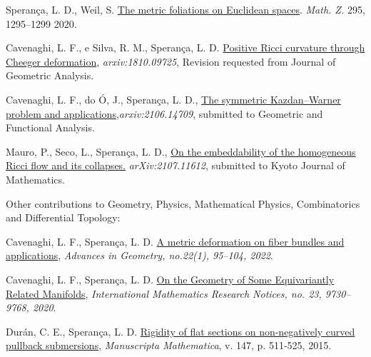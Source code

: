 \documentclass[10pt]{article}
\newenvironment{innerlist}[1][\enskip\textbullet]%
{\begin{compactitem}[#1]}{\end{compactitem}}
\begin{document}
\begin{enumerate}
\begin{innerlist}[-]
		
		\item Sperança, L. D., Weil, S.  \href{https://link.springer.com/article/10.1007/s00209-019-02425-3}{The metric foliations on Euclidean spaces}. \textit{Math. Z.} 295, 1295–1299 2020.
		
		
		\item Cavenaghi, L. F., e Silva, R. M., Sperança, L. D. \href{https://arxiv.org/abs/1810.09725}{Positive Ricci curvature through Cheeger deformation},
		\textit{{arxiv:1810.09725}}, Revision requested from  Journal of Geometric Analysis.
		
		
		
		\item Cavenaghi, L. F., do Ó, J., Sperança, L. D., \href{https://arxiv.org/abs/2106.14709}{The symmetric Kazdan--Warner problem and applications},\textit{{arxiv:2106.14709}}, submitted to Geometric and Functional Analysis.
		
		
		
		
		\item  Mauro, P., Seco, L., Sperança, L. D., \href{https://arxiv.org/abs/2107.11612}{On the embeddability of the homogeneous Ricci flow and its collapses.} \textit{{arXiv:2107.11612}}, submitted to  Kyoto Journal of Mathematics.
		
		
		
		\end{innerlist}
		
		
		\item 
		Other contributions to Geometry, Physics, Mathematical Physics, Combinatorics and Differential Topology:
		
		
		\begin{innerlist}[-]
					\item Cavenaghi, L. F., Sperança, L. D. \href{https://doi.org/10.1515/advgeom-2021-0007}{A metric deformation on fiber bundles and applications},  \textit{Advances in Geometry, no.22(1), 95--104, 2022}.
			
			
			\item Cavenaghi, L. F., Sperança, L. D. \href{https://academic.oup.com/imrn/advance-article-abstract/doi/10.1093/imrn/rny268/5194089}{On the Geometry of Some Equivariantly Related Manifolds},  	\textit{ {International Mathematics Research Notices, no. 23, 9730–9768, 2020}}.
			
			
			
			\item Durán, C. E., Sperança, L. D. \href{https://link.springer.com/article/10.1007/s00229-015-0731-0}{Rigidity of flat sections on non-negatively curved pullback submersions}, {\textit{Manuscripta Mathematica}, v. 147, p. 511-525, 2015}.


\end{innerlist}
\end{enumerate}
\end{document}
